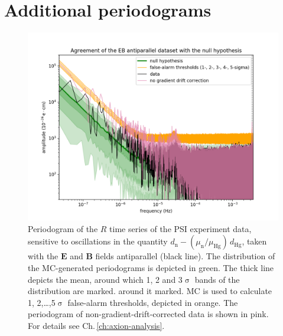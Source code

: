 \manualmark
{} 


\chapter{Additional periodograms}
\label{ch:alp_appendix}

\begin{figure}[h!]
  \centering
  \includegraphics[width=\linewidth]{gfx/axions/AP_detection_and_no_GDC.png}
  \caption{Periodogram of the $R$ time series of the PSI experiment data, sensitive to oscillations in the quantity $d_\mathrm{n} - \left( \mu_\mathrm{n} / \mu_\mathrm{Hg} \right) \, d_\mathrm{Hg}$, taken with the $\mathbf{E}$ and $\mathbf{B}$ fields antiparallel (black line).
  The distribution of the MC-generated periodograms is depicted in green. The thick line depicts the mean, around which 1, 2 and 3$\upsigma$ bands of the distribution are marked. around it marked. MC is used to calculate 1, 2,…,5$\upsigma$ false-alarm thresholds, depicted in orange.
  The periodogram of non-gradient-drift-corrected data is shown in pink. For details see Ch.\,\ref{ch:axion-analysis}.}\label{fig:app_AP_periodogram}
\end{figure}


